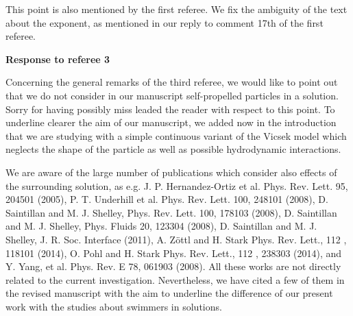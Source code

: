 \documentclass[a4paper,11pt]{letter}
\begin{document}
This point is also mentioned by the first referee. We fix the ambiguity of the text about the exponent, as mentioned in our reply to comment 17th of the first referee.








\pagebreak

{\Large \bf Response to referee 3}

Concerning the general remarks of the third referee, we would like to point out that we do not consider in our manuscript self-propelled particles in a solution. Sorry for having possibly miss leaded the reader with respect to this point. To underline clearer the aim of our manuscript, we added now in the introduction that we are studying with a simple continuous variant of the Vicsek model which neglects the shape of the particle as well as possible hydrodynamic interactions.


We are aware of the large number of publications which consider also effects of the surrounding solution, as e.g. J. P. Hernandez-Ortiz et al. Phys. Rev. Lett. 95, 204501 (2005), P. T. Underhill et al. Phys. Rev. Lett. 100, 248101 (2008), D. Saintillan and M. J. Shelley, Phys. Rev. Lett. 100, 178103 (2008), D. Saintillan and M. J. Shelley, Phys. Fluids 20, 123304 (2008), D. Saintillan and M. J. Shelley, J. R. Soc. Interface (2011), A. Zöttl and H. Stark Phys. Rev. Lett., 112 , 118101 (2014), O. Pohl and H. Stark Phys. Rev. Lett., 112 , 238303 (2014), and Y. Yang, et al. Phys. Rev. E 78, 061903 (2008). All these works are not directly related to the current investigation. Nevertheless, we have cited a few of them in the revised manuscript with the aim to underline the difference of our present work with the studies about swimmers in solutions.
\end{document}
